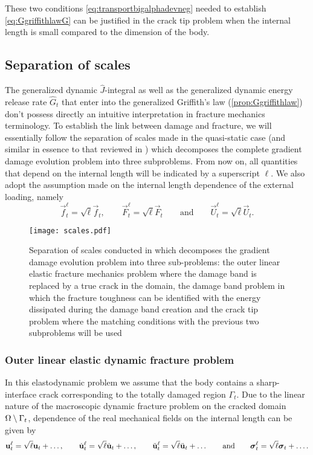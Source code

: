 \begin{remark}
These two conditions \eqref{eq:transportbigalphadevneg} needed to establish \eqref{eq:GgriffithlawG} can be justified in the crack tip problem when the internal length is small compared to the dimension of the body.
\end{remark}

\subsection{Separation of scales} \label{sec:asymptotic}
The generalized dynamic $\widehat{J}$-integral as well as the generalized dynamic energy release rate $\widehat{G}_t$ that enter into the generalized Griffith's law (\cref{prop:Ggriffithlaw}) don't possess directly an intuitive interpretation in fracture mechanics terminology. To establish the link between damage and fracture, we will essentially follow the separation of scales made in the quasi-static case \cite{SicsicMarigo:2013} (and similar in essence to that reviewed in \cite{HakimKarma:2009}) which decomposes the complete gradient damage evolution problem into three subproblems. From now on, all quantities that depend on the internal length will be indicated by a superscript $\ell$. We also adopt the assumption made on the internal length dependence of the external loading, namely
\begin{equation} \label{eq:loadingell}
\vec{f}_t^\ell=\sqrt{\ell}\vec{f}_t,\qquad\vec{F}_t^\ell=\sqrt{\ell}\vec{F}_t\qquad\text{and}\qquad\vec{U}_t^\ell=\sqrt{\ell}\vec{U}_t.
\end{equation}
\begin{figure}[htbp]
\centering
\texttt{[image: scales.pdf]}
\caption{Separation of scales conducted in \cite{SicsicMarigo:2013} which decomposes the gradient damage evolution problem into three sub-problems: the outer linear elastic fracture mechanics problem where the damage band is replaced by a true crack in the domain, the damage band problem in which the fracture toughness can be identified with the energy dissipated during the damage band creation and the crack tip problem where the matching conditions with the previous two subproblems will be used}
\end{figure}

\subsubsection{Outer linear elastic dynamic fracture problem}
In this elastodynamic problem we assume that the body contains a sharp-interface crack corresponding to the totally damaged region $\Gamma_t$. Due to the linear nature of the macroscopic dynamic fracture problem on the cracked domain ${\Omega\setminus\Gamma_t}$, dependence of the real mechanical fields on the internal length can be given by
\begin{equation} \label{eq:dependenceell}
\vec{u}_t^\ell=\sqrt{\ell}\vec{u}_t+\ldots,\qquad\dot{\vec{u}}^\ell_t=\sqrt{\ell}\dot{\vec{u}}_t+\ldots,\qquad\ddot{\vec{u}}^\ell_t=\sqrt{\ell}\ddot{\vec{u}}_t+\ldots\qquad\text{and}\qquad\sig_t^\ell=\sqrt{\ell}\sig_t+\ldots.
\end{equation}

